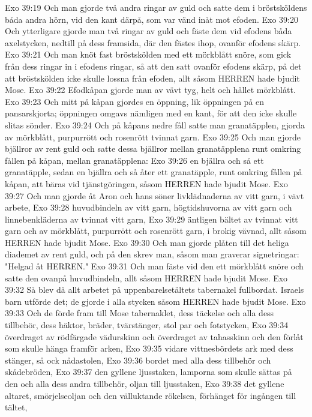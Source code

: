 Exo 39:19  Och man gjorde två andra ringar av guld och satte dem i bröstsköldens båda andra hörn, vid den kant därpå, som var vänd inåt mot efoden.
Exo 39:20  Och ytterligare gjorde man två ringar av guld och fäste dem vid efodens båda axelstycken, nedtill på dess framsida, där den fästes ihop, ovanför efodens skärp.
Exo 39:21  Och man knöt fast bröstskölden med ett mörkblått snöre, som gick från dess ringar in i efodens ringar, så att den satt ovanför efodens skärp, på det att bröstskölden icke skulle lossna från efoden, allt såsom HERREN hade bjudit Mose.
Exo 39:22  Efodkåpan gjorde man av vävt tyg, helt och hållet mörkblått.
Exo 39:23  Och mitt på kåpan gjordes en öppning, lik öppningen på en pansarskjorta; öppningen omgavs nämligen med en kant, för att den icke skulle slitas sönder.
Exo 39:24  Och på kåpans nedre fåll satte man granatäpplen, gjorda av mörkblått, purpurrött och rosenrött tvinnat garn.
Exo 39:25  Och man gjorde bjällror av rent guld och satte dessa bjällror mellan granatäpplena runt omkring fållen på kåpan, mellan granatäpplena:
Exo 39:26  en bjällra och så ett granatäpple, sedan en bjällra och så åter ett granatäpple, runt omkring fållen på kåpan, att bäras vid tjänstgöringen, såsom HERREN hade bjudit Mose.
Exo 39:27  Och man gjorde åt Aron och hans söner livklädnaderna av vitt garn, i vävt arbete,
Exo 39:28  huvudbindeln av vitt garn, högtidshuvorna av vitt garn och linnebenkläderna av tvinnat vitt garn,
Exo 39:29  äntligen bältet av tvinnat vitt garn och av mörkblått, purpurrött och rosenrött garn, i brokig vävnad, allt såsom HERREN hade bjudit Mose.
Exo 39:30  Och man gjorde plåten till det heliga diademet av rent guld, och på den skrev man, såsom man graverar signetringar: "Helgad åt HERREN."
Exo 39:31  Och man fäste vid den ett mörkblått snöre och satte den ovanpå huvudbindeln, allt såsom HERREN hade bjudit Mose.
Exo 39:32  Så blev då allt arbetet på uppenbarelsetältets tabernakel fullbordat. Israels barn utförde det; de gjorde i alla stycken såsom HERREN hade bjudit Mose.
Exo 39:33  Och de förde fram till Mose tabernaklet, dess täckelse och alla dess tillbehör, dess häktor, bräder, tvärstänger, stol par och fotstycken,
Exo 39:34  överdraget av rödfärgade vädurskinn och överdraget av tahasskinn och den förlåt som skulle hänga framför arken,
Exo 39:35  vidare vittnesbördets ark med dess stänger, så ock nådastolen,
Exo 39:36  bordet med alla dess tillbehör och skådebröden,
Exo 39:37  den gyllene ljusstaken, lamporna som skulle sättas på den och alla dess andra tillbehör, oljan till ljusstaken,
Exo 39:38  det gyllene altaret, smörjelseoljan och den välluktande rökelsen, förhänget för ingången till tältet,
